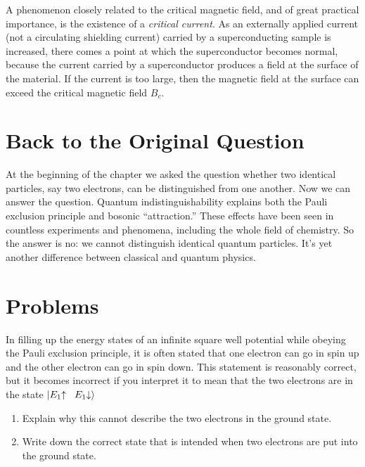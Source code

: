 A phenomenon closely related to the critical magnetic field, and of
great practical importance, is the existence of a {\em critical
current}.  As an externally applied current (not a circulating
shielding current) carried by a superconducting sample is increased,
there comes a point at which the superconductor becomes normal, because
the current carried by a superconductor produces a field
at the surface of the material.  If the current is too large, then the
magnetic field at the surface can exceed the critical magnetic field
$B_c$.


\section{Back to the Original Question}
\label{sec:backto_original_question}

At the beginning of the chapter we asked the question whether two
identical particles, say two electrons, can be distinguished from one
another.  Now we can answer the question.  Quantum indistinguishability
explains both the Pauli exclusion principle and bosonic ``attraction.''
These effects have been seen in countless experiments and phenomena,
including the whole field of chemistry.  So the answer is no: we
cannot distinguish identical quantum particles.  It's yet another
difference between classical and quantum physics.

\vfill

\newpage

\section*{Problems}
\label{sec:quantum_statistics_problems}

\begin{problem}
  In filling up the energy states of an infinite square well potential
  while obeying the Pauli
  exclusion principle, it is often stated that one
  electron can go in spin up and the other electron can go in spin
  down.  This statement is reasonably correct, but it becomes incorrect
  if you interpret it to mean that the two electrons are in the state
  $|E_1\hspace{-1mm}\uparrow \hspace{2mm} E_1\hspace{-1mm}\downarrow\rangle$
  \begin{enumerate}
  \item Explain why this cannot describe the two electrons in the
    ground state.
  \item Write down the correct state that is intended when two
    electrons are put into the ground state.
  \end{enumerate}
\end{problem}

